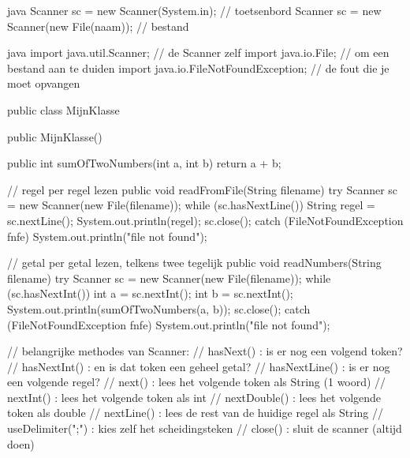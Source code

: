 \documentclass[a4paper,11pt]{article}
\begin{document}
\begin{codeblock}{java}
    Scanner sc = new Scanner(System.in);            // toetsenbord
    Scanner sc = new Scanner(new File(naam));       // bestand
\end{codeblock}

\begin{codeblock}[scanner]{java}
    import java.util.Scanner;          // de Scanner zelf
    import java.io.File;               // om een bestand aan te duiden
    import java.io.FileNotFoundException; // de fout die je moet opvangen

    public class MijnKlasse
        {
            public MijnKlasse() {
                }

            public int sumOfTwoNumbers(int a, int b) {
                    return a + b;
                }

            // regel per regel lezen
            public void readFromFile(String filename) {
                    try {
                            Scanner sc = new Scanner(new File(filename));
                            while (sc.hasNextLine())
                            {
                                    String regel = sc.nextLine();
                                    System.out.println(regel);
                                }
                            sc.close();
                        }
                    catch (FileNotFoundException fnfe) {
                            System.out.println("file not found");
                        }
                }

            // getal per getal lezen, telkens twee tegelijk
            public void readNumbers(String filename) {
                    try {
                            Scanner sc = new Scanner(new File(filename));
                            while (sc.hasNextInt())
                            {
                                    int a = sc.nextInt();
                                    int b = sc.nextInt();
                                    System.out.println(sumOfTwoNumbers(a, b));
                                }
                            sc.close();
                        }
                    catch (FileNotFoundException fnfe) {
                            System.out.println("file not found");
                        }
                }
        }

    // belangrijke methodes van Scanner:
    // hasNext()      : is er nog een volgend token?
    // hasNextInt()   : en is dat token een geheel getal?
    // hasNextLine()  : is er nog een volgende regel?
    // next()         : lees het volgende token als String (1 woord)
    // nextInt()      : lees het volgende token als int
    // nextDouble()   : lees het volgende token als double
    // nextLine()     : lees de rest van de huidige regel als String
    // useDelimiter(";") : kies zelf het scheidingsteken
    // close()        : sluit de scanner (altijd doen)
\end{codeblock}
\end{document}
